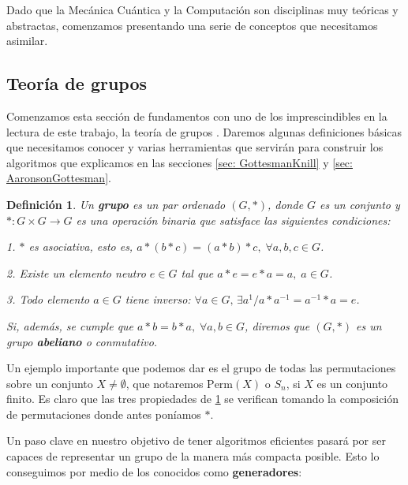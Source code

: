 \documentclass[11pt,a4paper,twoside,pdf]{article}
\numberwithin{equation}{section}
\newtheorem{definition}{Definición}
\begin{document}
	Dado que la Mecánica Cuántica y la Computación son disciplinas muy teóricas y abstractas, comenzamos presentando una serie de conceptos que necesitamos asimilar.
	
	\subsection{Teoría de grupos}
%	
%
	
	Comenzamos esta sección de fundamentos con uno de los imprescindibles en la lectura de este trabajo, la teoría de grupos \cite{Grupos}. Daremos algunas definiciones básicas que necesitamos conocer y varias herramientas que servirán para construir los algoritmos que explicamos en las secciones \ref{sec: GottesmanKnill} y \ref{sec: AaronsonGottesman}.
	
		\begin{definition} \label{def: grupo}
			Un \textbf{grupo} es un par ordenado $(G,\ast)$, donde $G$ es un conjunto y $\ast : G\times G \longrightarrow G$ es una operación binaria que satisface las siguientes condiciones:
			
				1.  $\ast$ es asociativa, esto es, $a\ast(b\ast c)=(a\ast b)\ast c, \; \forall a,b,c \in G$.
				
				2.  Existe un elemento neutro $e\in G$ tal que $a\ast e=e\ast a=a, \; a\in G$.
				
				3. Todo elemento $a \in G$ tiene inverso: $\forall a \in G, \, \exists a^{1} / a\ast a^{-1}=a^{-1}\ast a =e $.	
				
			\noindent Si, además, se cumple que $a\ast b =b\ast a, \; \forall a,b\in G$, diremos que $(G,\ast)$ es un grupo \textbf{abeliano} o conmutativo.
		\end{definition}
	
	Un ejemplo importante que podemos dar es el grupo de todas las permutaciones sobre un conjunto $X\ne\emptyset$, que notaremos $\text{Perm}(X)$ o $S_n$, si $X$ es un conjunto finito. Es claro que las tres propiedades de \ref{def: grupo} se verifican tomando la composición de permutaciones donde antes poníamos $\ast$.
	
	Un paso clave en nuestro objetivo de tener algoritmos eficientes pasará por ser capaces de representar un grupo de la manera más compacta posible. Esto lo conseguimos por medio de los conocidos como \textbf{generadores}:
	
\end{document}
